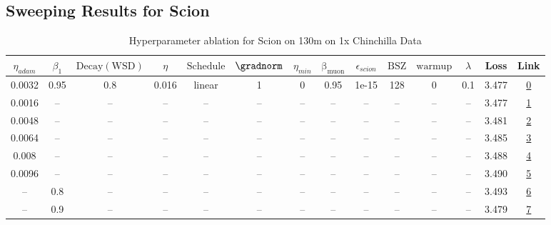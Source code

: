 \subsection{Sweeping Results for Scion}%
\begin{table}[H]
\centering
\caption{Hyperparameter ablation for Scion on 130m on 1x Chinchilla Data}
\label{tab:ablation_scion_130m_on_1x_chinchilla_data}
\begin{tabular}{cccccccccccccc}
\toprule
$\eta_{adam}$ & $\beta_1$ & $\mathrm{Decay (WSD)}$ & $\eta$ & $\mathrm{Schedule}$ & $\gradnorm$ & $\eta_{min}$ & $\mathrm{\beta_{muon}}$ & $\epsilon_{scion}$ & $\mathrm{BSZ}$ & $\mathrm{warmup}$ & $\lambda$ & Loss & Link \\
\midrule
0.0032 & 0.95 & 0.8 & 0.016 & linear & 1 & 0 & 0.95 & 1e-15 & 128 & 0 & 0.1 & 3.477 & \href{https://wandb.ai/stanford-mercury/optimizer-scaling/runs/sweep-130m-2B-scion88e825lr0.016-wd0.1-minlr0-warmup0-b10.95-gn1-09a932}{0} \\
\midrule
0.0016 & -- & -- & -- & -- & -- & -- & -- & -- & -- & -- & -- & 3.477 & \href{https://wandb.ai/stanford-mercury/optimizer-scaling/runs/sweep-130m-2B-scion840d88lr0.016-wd0.1-minlr0-warmup0-b10.95-gn1-61f5f7}{1} \\
0.0048 & -- & -- & -- & -- & -- & -- & -- & -- & -- & -- & -- & 3.481 & \href{https://wandb.ai/stanford-mercury/optimizer-scaling/runs/sweep-130m-2B-scion8e26felr0.016-wd0.1-minlr0-warmup0-b10.95-gn1-382d16}{2} \\
0.0064 & -- & -- & -- & -- & -- & -- & -- & -- & -- & -- & -- & 3.485 & \href{https://wandb.ai/stanford-mercury/optimizer-scaling/runs/sweep-130m-2B-scionf020a1lr0.016-wd0.1-minlr0-warmup0-b10.95-gn1-f5cf5d}{3} \\
0.008 & -- & -- & -- & -- & -- & -- & -- & -- & -- & -- & -- & 3.488 & \href{https://wandb.ai/stanford-mercury/optimizer-scaling/runs/sweep-130m-2B-sciona0879alr0.016-wd0.1-minlr0-warmup0-b10.95-gn1-99b18a}{4} \\
0.0096 & -- & -- & -- & -- & -- & -- & -- & -- & -- & -- & -- & 3.490 & \href{https://wandb.ai/stanford-mercury/optimizer-scaling/runs/sweep-130m-2B-scion4bb4a4lr0.016-wd0.1-minlr0-warmup0-b10.95-gn1-e076fe}{5} \\
-- & 0.8 & -- & -- & -- & -- & -- & -- & -- & -- & -- & -- & 3.493 & \href{https://wandb.ai/stanford-mercury/optimizer-scaling/runs/sweep-130m-2B-scion76ae21lr0.016-wd0.1-minlr0-warmup0-b10.8-gn1--382a96}{6} \\
-- & 0.9 & -- & -- & -- & -- & -- & -- & -- & -- & -- & -- & 3.479 & \href{https://wandb.ai/stanford-mercury/optimizer-scaling/runs/sweep-130m-2B-scione9cd68lr0.016-wd0.1-minlr0-warmup0-b10.9-gn1--16327d}{7} \\

\end{tabular}
\end{table}
